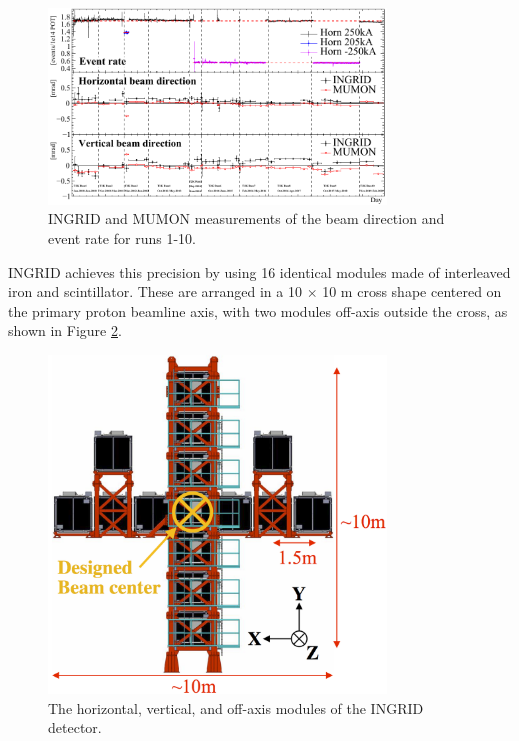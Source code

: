 \begin{figure}
\centering
\includegraphics*[width=0.8\textwidth,clip]{figs/ingrid_official_mumon_si_ic}
\caption{INGRID and MUMON measurements of the beam direction and event rate for runs 1-10.} \label{mumoningrid}
\end{figure}

INGRID achieves this precision by using 16 identical modules made of interleaved iron and scintillator. These are arranged in a 10 $\times$ 10 m cross shape centered on the primary proton beamline axis, with two modules off-axis outside the cross, as shown in Figure \ref{ingridcross}. 

\begin{figure}
\centering
\includegraphics*[width=0.8\textwidth,clip]{figs/ingridcross}
\caption{The horizontal, vertical, and off-axis modules of the INGRID detector.} \label{ingridcross}
\end{figure}

